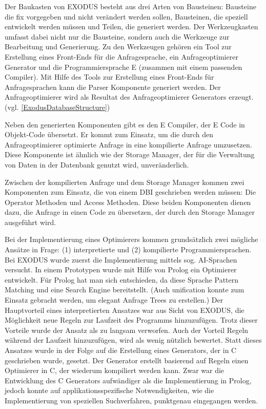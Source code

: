 Der Baukasten von EXODUS besteht aus drei Arten von Bausteinen: Bausteine die fix vorgegeben und nicht verändert werden sollen, Bausteinen, die speziell entwickelt werden müssen und Teilen, die generiert werden. Der Werkzeugkasten umfasst dabei nicht nur die Bausteine, sondern auch die Werkzeuge zur Bearbeitung und Generierung. Zu den Werkzeugen gehören ein Tool zur Erstellung eines Front-Ends für die Anfragesprache, ein Anfrageoptimierer Generator und die Programmiersprache E (zusammen mit einem passenden Compiler). Mit Hilfe des Tools zur Erstellung eines Front-Ends für Anfragesprachen kann die Parser Komponente generiert werden. Der Anfrageoptimierer wird als Resultat des Anfrageoptimierer Generators erzeugt. (vgl. \ref{ExodusDatabaseStructure})

Neben den generierten Komponenten gibt es den E Compiler, der E Code in Objekt-Code übersetzt. Er kommt zum Einsatz, um die durch den Anfrageoptimierer optimierte Anfrage in eine kompilierte Anfrage umzusetzen. Diese Komponente ist ähnlich wie der Storage Manager, der für die Verwaltung von Daten in der Datenbank genutzt wird, unveränderlich. 

Zwischen der kompilierten Anfrage und dem Storage Manager kommen zwei Komponenten zum Einsatz, die von einem DBI geschrieben werden müssen: Die Operator Methoden und Access Methoden. Diese beiden Komponenten dienen dazu, die Anfrage in einen Code zu übersetzen, der durch den  Storage Manager ausgeführt wird.

Bei der Implementierung eines Optimierers kommen grundsätzlich zwei mögliche Ansätze in Frage: (1) interpretierte und (2) kompilierte Programmiersprachen. Bei EXODUS wurde zuerst die Implementierung mittels sog. AI-Sprachen versucht. In einem Prototypen wurde mit Hilfe von Prolog ein Optimierer entwickelt. Für Prolog hat man sich entschieden, da diese Sprache Pattern Matching und eine Search Engine bereitstellt. (Auch unification konnte zum Einsatz gebracht werden, um elegant Anfrage Trees zu erstellen.) Der Hauptvorteil eines interpretierten Ansatzes war aus Sicht von EXODUS, die Möglichkeit neue Regeln zur Laufzeit des Programms hinzuzufügen. Trotz dieser Vorteile wurde der Ansatz als zu langsam verworfen. Auch der Vorteil Regeln während der Laufzeit hinzuzufügen, wird als wenig nützlich bewertet. Statt dieses Ansatzes wurde in der Folge auf die Erstellung eines Generators, der in C geschrieben wurde, gesetzt. Der Generator erstellt basierend auf Regeln einen Optimierer in C, der wiederum kompiliert werden kann. Zwar war die Entwicklung des C Generators aufwändiger als die Implementierung in Prolog, jedoch konnte auf applikationsspezifische Notwendigkeiten, wie die Implementierung von speziellen Suchverfahren, punktgenau eingegangen werden.


